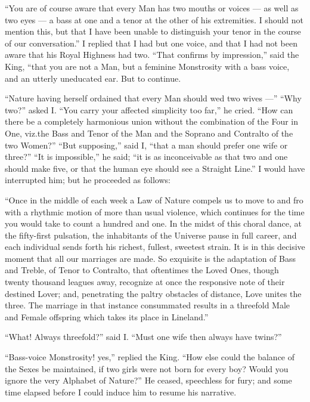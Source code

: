 \documentclass[10pt, kindle, oneside]{kindle}
\begin{document}
``You are of course aware that every Man has two mouths or voices --- as well as
two eyes --- a bass at one and a tenor at the other of his extremities. I should
not mention this, but that I have been unable to distinguish your tenor in the
course of our conversation.'' I replied that I had but one voice, and that I
had not been aware that his Royal Highness had two. ``That confirms by
impression,'' said the King, ``that you are not a Man, but a feminine
Monstrosity with a bass voice, and an utterly uneducated ear. But to continue.

``Nature having herself ordained that every Man should wed two wives ---'' ``Why
two?'' asked I. ``You carry your affected simplicity too far,'' he cried. ``How
can there be a completely harmonious union without the combination of the Four
in One, viz.\@ the Bass and Tenor of the Man and the Soprano and Contralto of
the two Women?'' ``But supposing,'' said I, ``that a man should prefer one wife or
three?'' ``It is impossible,'' he said; ``it is as inconceivable as that two and
one should make five, or that the human eye should see a Straight Line.'' I
would have interrupted him; but he proceeded as follows:

``Once in the middle of each week a Law of Nature compels us to move to and fro
with a rhythmic motion of more than usual violence, which continues for the
time you would take to count a hundred and one. In the midst of this choral
dance, at the fifty-first pulsation, the inhabitants of the Universe pause in
full career, and each individual sends forth his richest, fullest, sweetest
strain. It is in this decisive moment that all our marriages are made. So
exquisite is the adaptation of Bass and Treble, of Tenor to Contralto, that
oftentimes the Loved Ones, though twenty thousand leagues away, recognize at
once the responsive note of their destined Lover; and, penetrating the paltry
obstacles of distance, Love unites the three. The marriage in that instance
consummated results in a threefold Male and Female offspring which takes its
place in Lineland.''

``What! Always threefold?'' said I. ``Must one wife then always have twins?''

``Bass-voice Monstrosity! yes,'' replied the King. ``How else could the balance
of the Sexes be maintained, if two girls were not born for every boy? Would
you ignore the very Alphabet of Nature?'' He ceased, speechless for fury; and
some time elapsed before I could induce him to resume his narrative.
\end{document}
